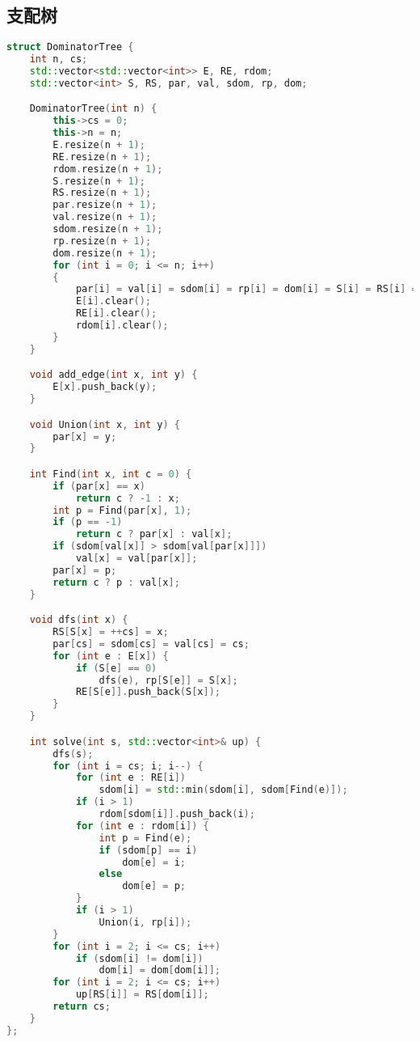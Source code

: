 \subsection{支配树}
\begin{lstlisting}[language=c++]
struct DominatorTree {
    int n, cs;
    std::vector<std::vector<int>> E, RE, rdom;
    std::vector<int> S, RS, par, val, sdom, rp, dom;

    DominatorTree(int n) {
        this->cs = 0;
        this->n = n;
        E.resize(n + 1);
        RE.resize(n + 1);
        rdom.resize(n + 1);
        S.resize(n + 1);
        RS.resize(n + 1);
        par.resize(n + 1);
        val.resize(n + 1);
        sdom.resize(n + 1);
        rp.resize(n + 1);
        dom.resize(n + 1);
        for (int i = 0; i <= n; i++)
        {
            par[i] = val[i] = sdom[i] = rp[i] = dom[i] = S[i] = RS[i] = 0;
            E[i].clear();
            RE[i].clear();
            rdom[i].clear();
        }
    }

    void add_edge(int x, int y) {
        E[x].push_back(y);
    }

    void Union(int x, int y) {
        par[x] = y;
    }

    int Find(int x, int c = 0) {
        if (par[x] == x)
            return c ? -1 : x;
        int p = Find(par[x], 1);
        if (p == -1)
            return c ? par[x] : val[x];
        if (sdom[val[x]] > sdom[val[par[x]]])
            val[x] = val[par[x]];
        par[x] = p;
        return c ? p : val[x];
    }

    void dfs(int x) {
        RS[S[x] = ++cs] = x;
        par[cs] = sdom[cs] = val[cs] = cs;
        for (int e : E[x]) {
            if (S[e] == 0)
                dfs(e), rp[S[e]] = S[x];
            RE[S[e]].push_back(S[x]);
        }
    }

    int solve(int s, std::vector<int>& up) {
        dfs(s);
        for (int i = cs; i; i--) {
            for (int e : RE[i])
                sdom[i] = std::min(sdom[i], sdom[Find(e)]);
            if (i > 1)
                rdom[sdom[i]].push_back(i);
            for (int e : rdom[i]) {
                int p = Find(e);
                if (sdom[p] == i)
                    dom[e] = i;
                else
                    dom[e] = p;
            }
            if (i > 1)
                Union(i, rp[i]);
        }
        for (int i = 2; i <= cs; i++)
            if (sdom[i] != dom[i])
                dom[i] = dom[dom[i]];
        for (int i = 2; i <= cs; i++)
            up[RS[i]] = RS[dom[i]];
        return cs;
    }
};
\end{lstlisting}